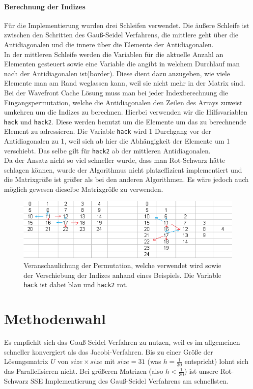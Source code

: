 \documentclass{article}
\begin{document}
\paragraph{Berechnung der Indizes}
Für die Implementierung wurden drei Schleifen verwendet. Die äußere Schleife ist zwischen den Schritten des Gauß-Seidel Verfahrens, die mittlere geht über die Antidiagonalen und die innere über die Elemente der Antidiagonalen. \\
In der mittleren Schleife werden die Variablen für die aktuelle Anzahl an Elementen gesteuert sowie eine Variable die angibt in welchem Durchlauf man nach der Antidiagonalen ist(border). Diese dient dazu anzugeben, wie viele Elemente man am Rand weglassen kann, weil sie nicht mehr in der Matrix sind.\\
Bei der Wavefront Cache Lösung muss man bei jeder Indexberechnung die Eingangspermutation, welche die Antidiagonalen den Zeilen des Arrays zuweist umkehren um die Indizes zu berechnen. Hierbei verwenden wir die Hilfsvariablen \texttt{hack} und \texttt{hack2}. Diese werden benutzt um die Elemente um das zu berechnende Element zu adressieren. Die Variable \texttt{hack} wird 1 Durchgang vor der Antidiagonalen zu 1, weil sich ab hier die Abhängigkeit der Elemente um 1 verschiebt. Das selbe gilt für \texttt{hack2} ab der mittleren Antidiagonalen. \\
Da der Ansatz nicht so viel schneller wurde, dass man Rot-Schwarz hätte schlagen können, wurde der Algorithmus nicht platzeffizient implementiert und die Matrixgröße ist größer als bei den anderen Algorithmen. Es wäre jedoch auch möglich gewesen dieselbe Matrixgröße zu verwenden.

\begin{figure}[h] 
  \centering
     \includegraphics[width=1\textwidth]{bilder/hack.png}
  \caption{Veranschaulichung der Permutation, welche verwendet wird sowie der Verschiebung der Indizes anhand eines Beispiels. Die Variable \texttt{hack} ist dabei blau und \texttt{hack2} rot.}
  \label{fig:Bild6}
\end{figure}

\section{Methodenwahl}
Es empfiehlt sich das Gauß-Seidel-Verfahren zu nutzen, weil es im allgemeinen schneller konvergiert als das Jacobi-Verfahren. Bis zu einer Größe der Lösungsmatrix $U$ von $size \times size$ mit $size = 31$ (was $h=\frac{1}{30}$ entspricht) lohnt sich das Parallelisieren nicht. Bei größeren Matrizen (also $h < \frac{1}{30}$) ist unsere Rot-Schwarz SSE Implementierung des Gauß-Seidel Verfahrens am schnellsten.
\end{document}
